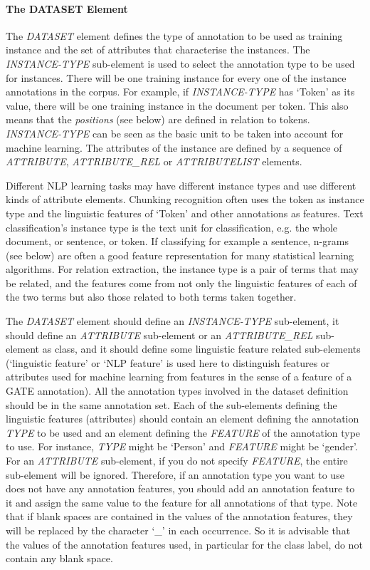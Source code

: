 \paragraph{The DATASET Element}

The {\em DATASET} element defines the type of annotation to be used as training
instance and the set of attributes that characterise the instances. The
{\em INSTANCE-TYPE} sub-element is used to select the annotation type to be used
for instances. There will be one training instance for every one of the instance
annotations in the corpus. For example, if {\em INSTANCE-TYPE} has `Token' as
its value, there will be one training instance in the document per token. This also
means that the {\em positions} (see below) are defined in relation to tokens.
{\em INSTANCE-TYPE} can be seen as the basic unit to be taken into account for
machine learning. The attributes of the instance are defined by a sequence of
{\em ATTRIBUTE}, {\em ATTRIBUTE\_REL} or {\em ATTRIBUTELIST} elements.

Different NLP learning tasks may have different instance types and use different
kinds of attribute elements. Chunking recognition often uses the token as
instance type and the linguistic features of `Token' and other annotations as
features. Text classification's instance type is the text unit for
classification, e.g. the whole document, or sentence, or token. If classifying
for example a sentence, n-grams (see below) are often a good feature
representation for many statistical learning algorithms. For relation extraction,
the instance type is a pair of terms that may be related, and the features come
from not only the linguistic features of each of the two terms but also those
related to both terms taken together.

The {\em DATASET} element should define an {\em INSTANCE-TYPE} sub-element, it
should define an {\em ATTRIBUTE} sub-element or an {\em ATTRIBUTE\_REL}
sub-element as class, and it should define some linguistic feature related
sub-elements (`linguistic feature' or `NLP feature' is used here to
distinguish features or attributes used for machine learning from features in the
sense of a feature of a GATE annotation). All the annotation types involved in
the dataset definition should be in the same annotation set. Each of the
sub-elements defining the linguistic features (attributes) should contain an
element defining the annotation {\em TYPE} to be used and an element defining the
{\em FEATURE} of the annotation type to use. For instance, {\em TYPE} might be
`Person' and {\em FEATURE} might be `gender'. For an {\em ATTRIBUTE}
sub-element, if you do not specify {\em FEATURE}, the entire sub-element will be
ignored. Therefore, if an annotation type you want to use does not have any
annotation features, you should add an annotation feature to it and assign the
same value to the feature for all annotations of that type. Note that if blank
spaces are contained in the values of the annotation features, they will be
replaced by the character `\_' in each occurrence.  So it is advisable that the
values of the annotation features used, in particular for the class label, do not
contain any blank space.

